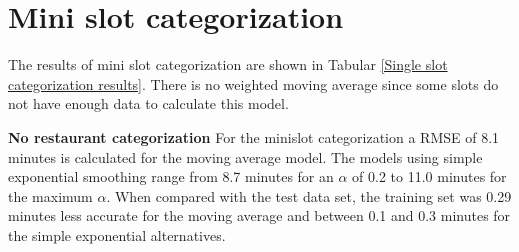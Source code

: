 \section{Mini slot categorization}\label{section:Single slot categorization}
The results of mini slot categorization are shown in Tabular \ref{Single slot categorization results}. There is no weighted moving average since some slots do not have enough data to calculate this model.
\begin{table}[h]
\centering
\caption{Mini slot categorization results}
\label{Single slot categorization results}
\end{table}
\newline\newline\textbf{No restaurant categorization}\newline
For the minislot categorization a RMSE of 8.1 minutes is calculated for the moving average model. The models using simple exponential smoothing range from 8.7 minutes for an $\alpha$ of 0.2 to 11.0 minutes for the maximum $\alpha$. When compared with the test data set, the training set was 0.29 minutes less accurate for the moving average and between 0.1 and 0.3 minutes for the simple exponential alternatives.\newline
